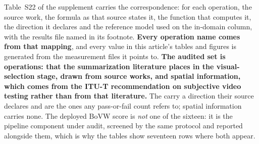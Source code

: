 Table~S22 of the supplement carries the correspondence: for each operation, the source
work, the formula as that source states it, the function that computes it, the direction
it declares and the reference model used on the in-domain column, with the results file
named in its footnote. \textbf{Every operation name comes from that mapping}, and every value in this article's
tables and figures is generated from the measurement files it points to.
\textbf{The audited set is \fontesOperacoes{} operations: \fontesDaLiteratura{} that the
summarization literature places in the visual-selection stage, drawn from
\fontesTrabalhos{} source works, and spatial information, which comes from the ITU-T
recommendation on subjective video testing rather than from that literature.} The
\fontesDaLiteratura{} carry a direction their source declares and are the ones any
pass-or-fail count refers to; spatial information carries none. The deployed BoVW score is \emph{not} one of
the sixteen: it is the pipeline component under audit, screened by the same protocol and
reported alongside them, which is why the tables show seventeen rows where both appear.


